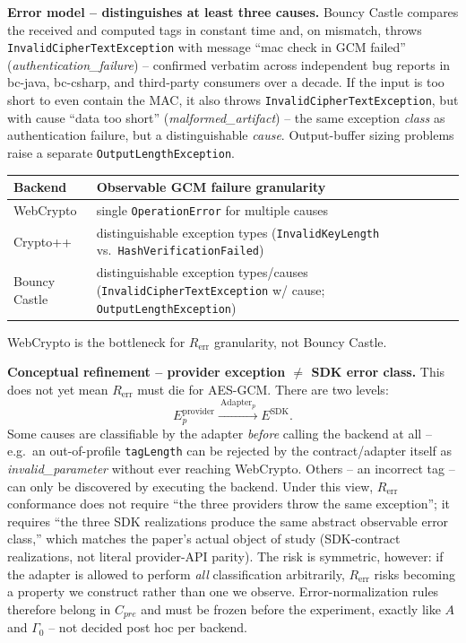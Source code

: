 \documentclass[11pt,a4paper]{article}
\begin{document}
\textbf{Error model -- distinguishes at least three causes.} Bouncy Castle compares the received and computed tags in constant time and, on mismatch, throws \texttt{InvalidCipherTextException} with message ``mac check in GCM failed'' (\emph{authentication\_failure}) -- confirmed verbatim across independent bug reports in bc-java, bc-csharp, and third-party consumers over a decade. If the input is too short to even contain the MAC, it also throws \texttt{InvalidCipherTextException}, but with cause ``data too short'' (\emph{malformed\_artifact}) -- the same exception \emph{class} as authentication failure, but a distinguishable \emph{cause}. Output-buffer sizing problems raise a separate \texttt{OutputLengthException}.

\begin{center}
\begin{tabularx}{\textwidth}{@{}l>{\raggedright\arraybackslash}X@{}}
\toprule
Backend & Observable GCM failure granularity \\
\midrule
WebCrypto & single \texttt{OperationError} for multiple causes \\
Crypto++ & distinguishable exception types (\texttt{InvalidKeyLength} vs.\ \texttt{HashVerificationFailed}) \\
Bouncy Castle & distinguishable exception types/causes (\texttt{InvalidCipherTextException} w/ cause; \texttt{OutputLengthException}) \\
\bottomrule
\end{tabularx}
\end{center}

WebCrypto is the bottleneck for $R_{\text{err}}$ granularity, not Bouncy Castle.

\textbf{Conceptual refinement -- provider exception $\neq$ SDK error class.} This does not yet mean $R_{\text{err}}$ must die for AES-GCM. There are two levels:
\[E_p^{\text{provider}} \xrightarrow{\ \text{Adapter}_p\ } E^{\text{SDK}}.\]
Some causes are classifiable by the adapter \emph{before} calling the backend at all -- e.g.\ an out-of-profile \texttt{tagLength} can be rejected by the contract/adapter itself as \emph{invalid\_parameter} without ever reaching WebCrypto. Others -- an incorrect tag -- can only be discovered by executing the backend. Under this view, $R_{\text{err}}$ conformance does not require ``the three providers throw the same exception''; it requires ``the three SDK realizations produce the same abstract observable error class,'' which matches the paper's actual object of study (SDK-contract realizations, not literal provider-API parity). The risk is symmetric, however: if the adapter is allowed to perform \emph{all} classification arbitrarily, $R_{\text{err}}$ risks becoming a property we construct rather than one we observe. Error-normalization rules therefore belong in $C_{pre}$ and must be frozen before the experiment, exactly like $A$ and $\Gamma_0$ -- not decided post hoc per backend.
\end{document}
